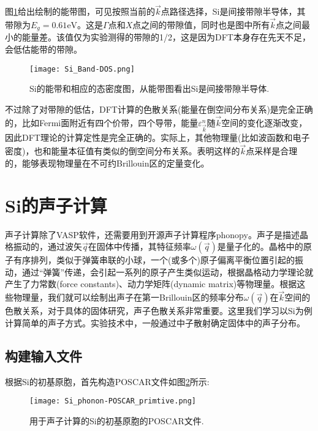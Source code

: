 图\ref{Si_Band-DOS}给出绘制的能带图，可见按照当前的$\vec k$点路径选择，\textrm{Si}是间接带隙半导体，其带隙为$E_g=0.61\textrm{eV}$。这是$\Gamma$点和$X$点之间的带隙值，同时也是图中所有$\vec k$点之间最小的能量差。该值仅为实验测得的带隙的1/2，这是因为\textrm{DFT}本身存在先天不足，会低估能带的带隙。
\begin{figure}[h!]
\centering
\texttt{[image: Si\_Band-DOS.png]}
\caption{\small \textrm{Si}的能带和相应的态密度图，从能带图看出\textrm{Si}是间接带隙半导体.}%
\label{Si_Band-DOS}
\end{figure}

不过除了对带隙的低估，\textrm{DFT}计算的色散关系(能量在倒空间分布关系)是完全正确的，比如\textrm{Fermi}面附近有四个价带，四个导带，能量$\varepsilon_{\vec k}^n$随$\vec k$空间的变化逐渐改变，因此\textrm{DFT}理论的计算定性是完全正确的。实际上，其他物理量(比如波函数和电子密度)，也和能量本征值有类似的倒空间分布关系。表明这样的$\vec k$点采样是合理的，能够表现物理量在不可约\textrm{Brillouin}区的定量变化。

\section{Si的声子计算}
声子计算除了\textrm{VASP}软件，还需要用到开源声子计算程序\textrm{phonopy}\cite{Phonopy}。声子是描述晶格振动的，通过波矢$\vec q$在固体中传播，其特征频率$\omega(\vec q)$是量子化的。晶格中的原子有序排列，类似于弹簧串联的小球，一个(或多个)原子偏离平衡位置引起的振动，通过“弹簧”传递，会引起一系列的原子产生类似运动，根据晶格动力学理论就产生了力常数\textrm{(force constants)}、动力学矩阵\textrm{(dynamic matrix)}等物理量。根据这些物理量，我们就可以绘制出声子在第一\textrm{Brillouin}区的频率分布$\omega(\vec q)$在$\vec k$空间的色散关系，对于具体的固体研究，声子色散关系非常重要。这里我们学习以\textrm{Si}为例计算简单的声子方式。实验技术中，一般通过中子散射确定固体中的声子分布。
\subsection{\rm{构建输入文件}}
根据\textrm{Si}的初基原胞，首先构造\textrm{POSCAR}文件如图\ref{Si_phonon-POSCAR_primitve}所示:~
\begin{figure}[h!]
\centering
\texttt{[image: Si\_phonon-POSCAR\_primtive.png]}
\caption{\small \textrm{用于声子计算的\textrm{Si}的初基原胞的\textrm{POSCAR}文件.}}%
\label{Si_phonon-POSCAR_primitve}
\end{figure}

